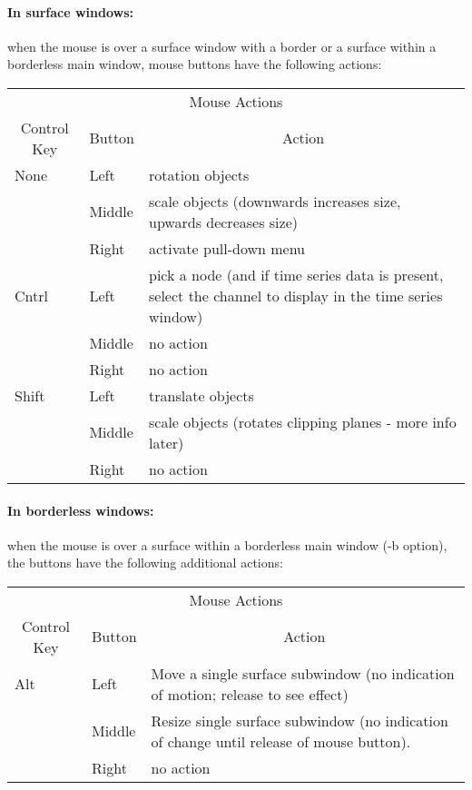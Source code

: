 \paragraph{In surface windows: } when the mouse is over a 
surface window with a border or a surface within a borderless main window,
mouse buttons have the following actions: 
\begin{center}
  \begin{tabular}{|l|l|p{3in}|} \hline
    \multicolumn{3}{|c|}{Mouse Actions}\\
    \multicolumn{1}{|c|}{Control Key} & 
    \multicolumn{1}{|c|}{Button} & 
    \multicolumn{1}{|c|}{Action}\\ \hline
None & Left & rotation objects \\
     & Middle & scale objects (downwards increases size, upwards decreases
    size) \\ 
     & Right & activate pull-down menu \\ \hline
Cntrl & Left & pick a node (and if time series data is present, select the
    channel to display in the time series window) \\
      & Middle &  no action \\
      & Right &  no action \\ \hline
Shift & Left & translate objects \\
      & Middle & scale objects (rotates clipping planes - more info later) \\
      & Right & no action \\ \hline
\end{tabular}
\end{center}

\paragraph{In borderless windows: } when the mouse is over a 
surface within a borderless main window (-b option), the buttons have the
following additional actions: 
\begin{center}
  \begin{tabular}{|l|l|p{3in}|} \hline
    \multicolumn{3}{|c|}{Mouse Actions}\\
    \multicolumn{1}{|c|}{Control Key} & 
    \multicolumn{1}{|c|}{Button} & 
    \multicolumn{1}{|c|}{Action}\\ \hline
Alt   & Left & Move a single surface subwindow
    (no indication of motion; release to see effect) \\ 
      & Middle & Resize single surface
    subwindow (no indication of change until release of mouse button).\\
      & Right & no action \\ \hline
  \end{tabular}
\end{center}

